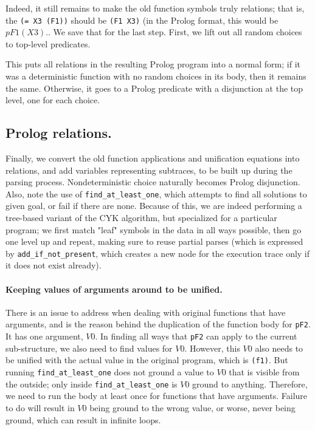 \documentclass{acmsiggraph}
\begin{document}
Indeed, it still remains to make the old function symbols truly relations; that
is, the \verb!(= X3 (F1))!  should be \verb!(F1 X3)! (in the Prolog format,
this would be $pF1(X3).$. We save that for the last step. First, we lift out
all random choices to top-level predicates. 



This puts all relations in the resulting Prolog program into a normal form; if
it was a deterministic function with no random choices in its body, then it
remains the same. Otherwise, it goes to a Prolog predicate with a disjunction
at the top level, one for each choice.

\subsection{Prolog relations.}

Finally, we convert the old function applications and unification equations
into relations, and add variables representing subtraces, to be built up during
the parsing process. Nondeterministic choice naturally becomes Prolog disjunction.
Also, note the use of \verb!find_at_least_one!, which attempts
to find all solutions to given goal, or fail if there are none. Because of
this, we are indeed performing a tree-based variant of the CYK algorithm, but
specialized for a particular program; we first match "leaf" symbols in the data
in all ways possible, then go one level up and repeat, making sure to reuse
partial parses (which is expressed by \verb!add_if_not_present!, which creates
a new node for the execution trace only if it does not exist already).



\paragraph{Keeping values of arguments around to be unified.}
There is an issue to address when dealing with original functions that have
arguments, and is the reason behind the duplication of the function body for
\verb!pF2!. It has one argument, $V0$. In finding all ways that \verb!pF2! can
apply to the current sub-structure, we also need to find values for $V0$.
However, this $V0$ also needs to be unified with the actual value in the
original program, which is \verb!(f1)!. But running \verb!find_at_least_one!
does not ground a value to $V0$ that is visible from the outside; only inside
\verb!find_at_least_one! is $V0$ ground to anything. Therefore, we need to run
the body at least once for functions that have arguments. Failure to do will
result in $V0$ being ground to the wrong value, or worse, never being ground,
which can result in infinite loops.
\end{document}
